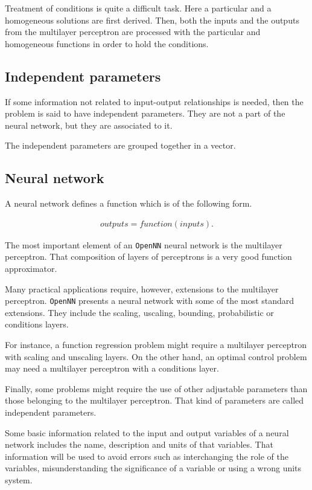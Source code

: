 Treatment of conditions is quite a difficult task. Here a particular and a homogeneous solutions are first derived. Then, both the inputs and the outputs from the multilayer perceptron are processed with the particular and homogeneous functions in order to hold the conditions. 

\subsection*{Independent parameters}

If some information not related to input-output relationships is
needed, then the problem is said to have independent parameters.
They are not a part of the neural network, but they are associated
to it. 

The independent parameters are grouped together in a vector. 

\subsection*{Neural network}

A neural network defines a function which is of the following form.

\begin{eqnarray}\nonumber
outputs = function(inputs). 
\end{eqnarray}


The most important element of an \texttt{OpenNN} neural network is the multilayer perceptron. 
That composition of layers of perceptrons is a very good function approximator. 

Many practical applications require, however, extensions to the multilayer perceptron. 
\texttt{OpenNN} presents a neural network with some of the most standard extensions. 
They include the scaling, uscaling, bounding, probabilistic or conditions layers.  

For instance, a function regression problem might require a multilayer perceptron with scaling and unscaling layers. 
On the other hand, an optimal control problem may need a multilayer perceptron with a conditions layer.

Finally, some problems might require the use of other adjustable parameters than those belonging to the multilayer perceptron. 
That kind of parameters are called independent parameters.

Some basic information related to the input and output variables of a neural network includes the name, description and units of that variables. That information will be used to avoid errors such as interchanging the role of the variables, misunderstanding the significance of a variable or using a wrong units system. 

